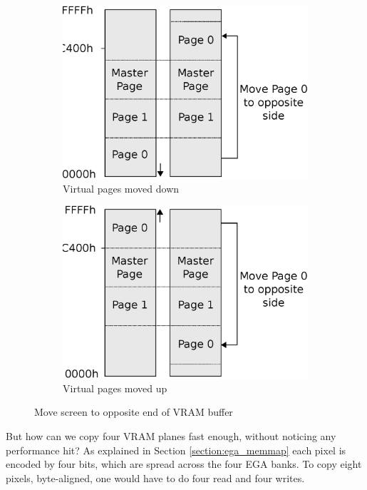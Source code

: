 \documentclass[book.tex]{subfiles}
\begin{document}
\par 
\begin{figure}[H]
\centering 
\begin{subfigure}{.5\textwidth}
  \centering
  \includegraphics[width=.9\textwidth]{imgs/drawings/Page_down_switch.eps}
  \caption*{Virtual pages moved down}
  \label{fig:page0_down}
\end{subfigure}%
\begin{subfigure}{.5\textwidth}
  \centering
  \includegraphics[width=.9\textwidth]{imgs/drawings/Page_up_switch.eps}
    \caption*{Virtual pages moved up}
  \label{fig:page0_up}
\end{subfigure}
\caption{Move screen to opposite end of VRAM buffer}
\label{fig:page_wrapping}
\end{figure}



\par
\begin{minipage}{\textwidth}
  
  \end{minipage}
  \label{ega_refresh}
  \par
But how can we copy four VRAM planes fast enough, without noticing any performance hit? As explained in Section \ref{section:ega_memmap} each pixel is encoded by four bits, which are spread across the four EGA banks. To copy eight pixels, byte-aligned, one would have to do four read and four writes.\\
\end{document}
